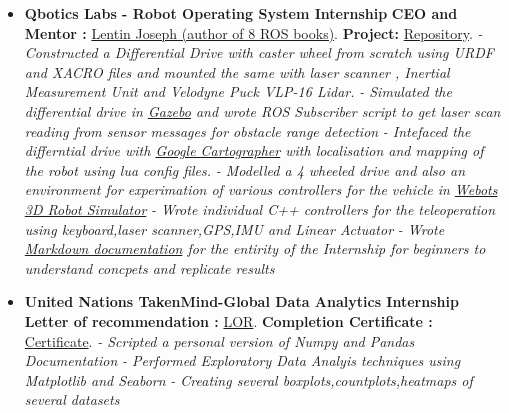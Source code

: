 \documentclass[a4paper,12pt]{article}
\begin{document}
\begin{itemize}
    \item{\textbf{\large{Qbotics Labs - Robot Operating System Internship}}
    \newline
    \textbf{ CEO and Mentor :} \href{https://in.linkedin.com/in/lentinjoseph}{Lentin Joseph (author of 8 ROS books)}.
    \textbf{ Project:} \href{https://github.com/teetangh/Qbotics-Labs-Internship-Differential-Drives}{Repository}.
    \newline
    \textit{- Constructed a Differential Drive with caster wheel from scratch using URDF and XACRO files and mounted the same with laser scanner , Inertial Measurement Unit and Velodyne Puck VLP-16 Lidar. }
    \newline
    \textit{- Simulated the differential drive in \underline{Gazebo} and wrote ROS Subscriber script to get laser scan reading from sensor messages for obstacle range detection }
    \newline
    \textit{- Intefaced the differntial drive with \underline{Google Cartographer} with localisation and mapping of the robot using lua config files. }
    \newline
    \textit{- Modelled a 4 wheeled drive and also an environment for experimation of various controllers for the vehicle in \underline{Webots 3D Robot Simulator}}
    \newline
    \textit{- Wrote individual C++ controllers for the teleoperation using keyboard,laser scanner,GPS,IMU and Linear Actuator}
    \newline
    \textit{- Wrote \underline{Markdown documentation} for the entirity of the Internship for beginners to understand concpets and replicate results}}
\end{itemize}
\begin{itemize}
    \item{\textbf{\large{United Nations TakenMind-Global Data Analytics Internship}}
    \newline
    \textbf{Letter of recommendation :} \href{https://github.com/teetangh/Kaustav-All-Certifications/blob/master/Artificial%20Intelligence/UN%20Takenmind%20Data%20Analytics%20Internship/35799-KaustavGhosh-recommendation-letter.pdf}{LOR}.
    \textbf{Completion Certificate :} \href{https://github.com/teetangh/Kaustav-All-Certifications/blob/master/Artificial%20Intelligence/UN%20Takenmind%20Data%20Analytics%20Internship/35799-KaustavGhosh.pdf}{Certificate}.
    \newline
    \textit{- Scripted a personal version of Numpy and Pandas Documentation }
    \newline
    \textit{- Performed Exploratory Data Analyis techniques using Matplotlib and Seaborn }
    \newline
    \textit{- Creating several boxplots,countplots,heatmaps of several datasets}}
\end{itemize}
\end{document}

